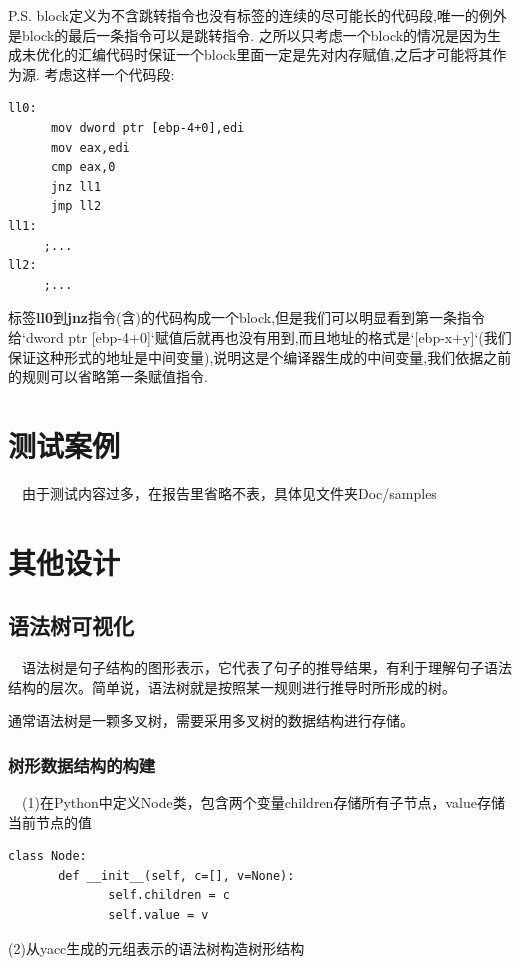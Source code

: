 \documentclass{article}
\begin{document}
P.S. block定义为不含跳转指令也没有标签的连续的尽可能长的代码段,唯一的例外是block的最后一条指令可以是跳转指令.
之所以只考虑一个block的情况是因为生成未优化的汇编代码时保证一个block里面一定是先对内存赋值,之后才可能将其作为源.
考虑这样一个代码段:

\begin{verbatim}
ll0:
      mov dword ptr [ebp-4+0],edi
      mov eax,edi
      cmp eax,0
      jnz ll1
      jmp ll2
ll1:
     ;...
ll2:
     ;...
\end{verbatim}

标签\textbf{ll0}到\textbf{jnz}指令(含)的代码构成一个block,但是我们可以明显看到第一条指令给`dword ptr [ebp-4+0]`赋值后就再也没有用到,而且地址的格式是`[ebp-x+y]`(我们保证这种形式的地址是中间变量),说明这是个编译器生成的中间变量,我们依据之前的规则可以省略第一条赋值指令.



\section{测试案例}

\quad\ \ 由于测试内容过多，在报告里省略不表，具体见文件夹Doc/samples

\section{其他设计}

\subsection{语法树可视化}
\quad \ \ 语法树是句子结构的图形表示，它代表了句子的推导结果，有利于理解句子语法结构的层次。简单说，语法树就是按照某一规则进行推导时所形成的树。


通常语法树是一颗多叉树，需要采用多叉树的数据结构进行存储。

\subsubsection{树形数据结构的构建}

\quad \ \ (1)在Python中定义Node类，包含两个变量children存储所有子节点，value存储当前节点的值

\begin{verbatim}
class Node:
       def __init__(self, c=[], v=None):
              self.children = c
              self.value = v
\end{verbatim}

(2)从yacc生成的元组表示的语法树构造树形结构
\end{document}
